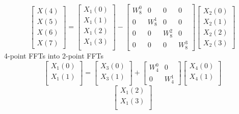 \documentclass[journal,12pt,twocolumn]{IEEEtran}
\renewcommand\thesection{\arabic{section}}
\begin{document}
\begin{enumerate}[label=\thesection.\arabic*
	,ref=\thesection.\theenumi]
\begin{enumerate}[label=\arabic*.,ref=\thesection.\theenumi]
	\begin{equation}
		\begin{bmatrix}
			X(4) \\ 
			X(5) \\ 
			X(6) \\ 
			X(7)
		\end{bmatrix}
		=
		\begin{bmatrix}
			X_{1}(0) \\ 
			X_{1}(1)\\ 
			X_{1}(2)\\
			X_{1}(3)\\
		\end{bmatrix}
		-
		\begin{bmatrix}
			W^{0}_{8} & 0 & 0 & 0\\
			0 & W^{1}_{8} & 0 & 0\\
			0 & 0 & W^{2}_{8} & 0\\
			0 & 0 & 0 & W^{3}_{8}
		\end{bmatrix}
		\begin{bmatrix}
			X_{2}(0) \\ 
			X_{2}(1) \\ 
			X_{2}(2) \\
			X_{2}(3)
		\end{bmatrix}
	\end{equation}
	4-point FFTs into 2-point FFTs
	\begin{equation}
		\begin{bmatrix}
			X_{1}(0) \\ 
			X_{1}(1)\\ 
		\end{bmatrix}
		=
		\begin{bmatrix}
			X_{3}(0) \\ 
			X_{3}(1)\\ 
		\end{bmatrix}
		+
		\begin{bmatrix}
			W^{0}_{4} & 0\\
			0 & W^{1}_{4}
		\end{bmatrix}
		\begin{bmatrix}
			X_{4}(0) \\ 
			X_{4}(1) \\ 
		\end{bmatrix}
	\end{equation}
	\begin{equation}
		\begin{bmatrix}
			X_{1}(2) \\ 
			X_{1}(3)\\ 

\end{bmatrix}
\end{equation}
\end{enumerate}
\end{enumerate}
\end{document}
